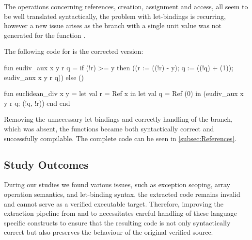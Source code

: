 The operations concerning references, creation, assignment and access, all seem to be well translated syntactically, the problem with
let-bindings is recurring, however a new issue arises as the  branch with a single unit value was not generated for the 
function .

The following code for \cml is the corrected version:

\begin{cakeml}
fun eudiv_aux x y r q =
  if (!r) >= y
  then ((r := ((!r) - y); q := ((!q) + (1)); eudiv_aux x y r q))
  else ()

fun euclidean_div x y =
  let val r = Ref x in
  let val q = Ref (0) in (eudiv_aux x y r q; (!q, !r)) 
    end end
\end{cakeml}

Removing the unnecessary let-bindings and correctly handling of the  branch, which was absent, the functions became 
both syntactically correct and successfully compilable. The complete code can be seen in \ref{subsec:References}.

\subsection{Study Outcomes}

During our studies we found various issues, such as exception scoping, array operation semantics, and let-binding syntax, the extracted 
code remains invalid and cannot serve as a verified executable target. Therefore, improving the extraction pipeline from \ocaml and 
\gospel to \cml necessitates careful handling of these language specific constructs to ensure that the resulting code is not only 
syntactically correct but also preserves the behaviour of the original verified source.